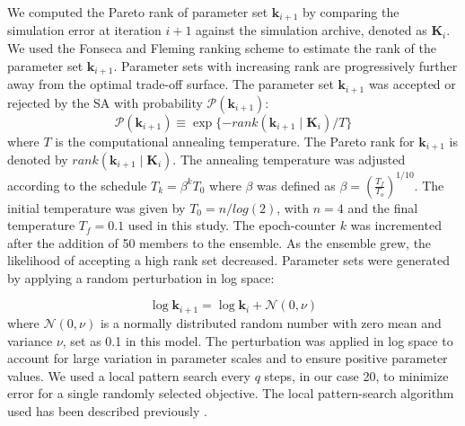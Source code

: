 \documentclass[12pt]{article}
\begin{document}
We computed the Pareto rank of parameter set $\mathbf{k}_{i+1}$ by comparing the simulation error at iteration $i+1$ against the simulation archive, denoted as $\mathbf{K}_i$. We used the Fonseca and Fleming ranking scheme \cite{Fonseca1993} to estimate the rank of the parameter set $\mathbf{k}_{i+1}$. Parameter sets with increasing rank are progressively further away from the optimal trade-off surface. The parameter set $\mathbf{k}_{i+1}$ was accepted or rejected by the SA with probability $\mathcal{P}\left(\mathbf{k}_{i+1}\right)$: 
\begin{equation}\label{eqn_costMOSA}
\mathcal{P}(\mathbf{k}_{i+1}) \equiv \exp{\{-rank\left(\mathbf{k}_{i+1} \mid \mathbf{K}_{i} \right)/T\}}
\end{equation}
where $T$ is the computational annealing temperature. The Pareto rank for $\mathbf{k}_{i+1}$ is denoted by $rank\left(\mathbf{k}_{i+1}\mid \mathbf{K}_{i}\right)$. The annealing temperature was  adjusted according to the schedule
$T_k = \beta^k T_0$
where $\beta$ was defined as $\beta = \left(\frac{T_{f}}{T_{o}}\right)^{1/10}$. The initial temperature was given by $T_0 = n/log(2)$, with $n=4$ and the final temperature $T_f = 0.1$ used in this study.
The epoch-counter $k$ was incremented after the addition of 50 members to the ensemble. As the ensemble grew, the likelihood of accepting a high rank set decreased. Parameter sets were generated by applying a random perturbation in log space: 

\begin{equation}
\log\mathbf{k}_{i+1} = \log\mathbf{k}_i + \mathcal{N}(0,\nu)
\end{equation}
where $\mathcal{N}(0,\nu)$ is a normally distributed random number with zero mean and variance $\nu$, set as 0.1 in this model. The perturbation was applied in log space to account for large variation in parameter scales and to ensure positive parameter values. We used a local pattern search every $q$ steps, in our case 20, to minimize error for a single randomly selected objective. The local pattern-search algorithm used has been described previously \cite{Gadkar2003}.


\clearpage


\clearpage
\end{document}
